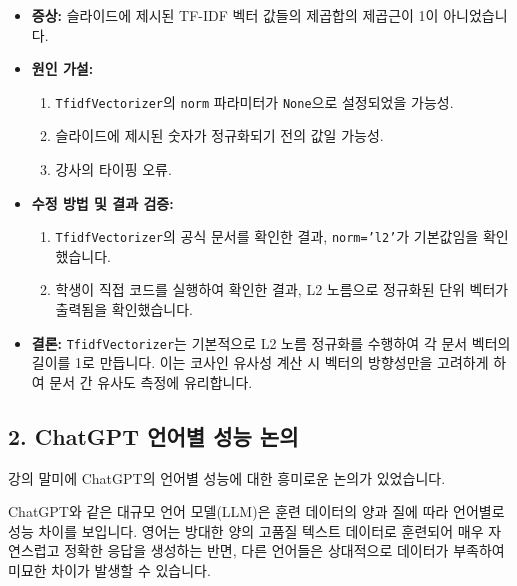 \documentclass[11pt,a4paper]{article}
\begin{document}
\begin{tcolorbox}[examplebox, title=NLTK 스테밍 코드 예시]
\begin{itemize}
    \item \textbf{증상:} 슬라이드에 제시된 TF-IDF 벡터 값들의 제곱합의 제곱근이 1이 아니었습니다.
    \item \textbf{원인 가설:}
        \begin{enumerate}
            \item \texttt{TfidfVectorizer}의 \texttt{norm} 파라미터가 \texttt{None}으로 설정되었을 가능성.
            \item 슬라이드에 제시된 숫자가 정규화되기 전의 값일 가능성.
            \item 강사의 타이핑 오류.
        \end{enumerate}
    \item \textbf{수정 방법 및 결과 검증:}
        \begin{enumerate}
            \item \texttt{TfidfVectorizer}의 공식 문서를 확인한 결과, \texttt{norm='l2'}가 기본값임을 확인했습니다.
            \item 학생이 직접 코드를 실행하여 확인한 결과, L2 노름으로 정규화된 단위 벡터가 출력됨을 확인했습니다.
        \end{enumerate}
    \item \textbf{결론:} \texttt{TfidfVectorizer}는 기본적으로 L2 노름 정규화를 수행하여 각 문서 벡터의 길이를 1로 만듭니다. 이는 코사인 유사성 계산 시 벡터의 방향성만을 고려하게 하여 문서 간 유사도 측정에 유리합니다.
\end{itemize}

\subsection*{2. ChatGPT 언어별 성능 논의}
강의 말미에 ChatGPT의 언어별 성능에 대한 흥미로운 논의가 있었습니다.

\begin{tcolorbox}[mybox, title=ChatGPT 언어별 성능 및 특징]
ChatGPT와 같은 대규모 언어 모델(LLM)은 훈련 데이터의 양과 질에 따라 언어별로 성능 차이를 보입니다.
영어는 방대한 양의 고품질 텍스트 데이터로 훈련되어 매우 자연스럽고 정확한 응답을 생성하는 반면, 다른 언어들은 상대적으로 데이터가 부족하여 미묘한 차이가 발생할 수 있습니다.
\end{tcolorbox}


\end{tcolorbox}
\end{document}
